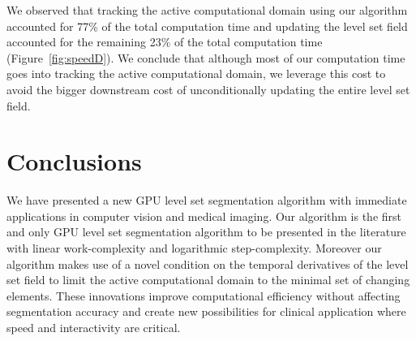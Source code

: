 \documentclass{egpubl}
\begin{document}
{{%

We observed that tracking the active computational domain using our algorithm accounted for 77\% of the total computation time and updating the level set field accounted for the remaining 23\% of the total computation time (Figure~\ref{fig:speedD}). We conclude that although most of our computation time goes into tracking the active computational domain, we leverage this cost to avoid the bigger downstream cost of unconditionally updating the entire level set field.




\section{Conclusions}
\label{sec:conclusions}

We have presented a new GPU level set segmentation algorithm with immediate applications in computer vision and medical imaging. Our algorithm is the first and only GPU level set segmentation algorithm to be presented in the literature with linear work-complexity and logarithmic step-complexity. Moreover our algorithm makes use of a novel condition on the temporal derivatives of the level set field to limit the active computational domain to the minimal set of changing elements. These innovations improve computational efficiency without affecting segmentation accuracy and create new possibilities for clinical application where speed and interactivity are critical.

}}
\end{document}
